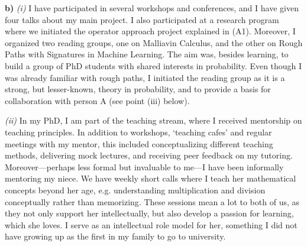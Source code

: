 \documentclass[./Research_statement.tex]{subfiles}
\begin{document}
\vspace{2pt}

\noindent \textbf{b)} \textit{(i)}
I have participated in several workshops and conferences, and I have given four talks about my main project. I also participated at a research program where we initiated the operator approach project explained in (A1). Moreover, I organized two reading groups, one on Malliavin Calculus, and the other on Rough Paths with Signatures in Machine Learning. The aim was, besides learning, to build a group of PhD students with shared interests in probability. Even though I was already familiar with rough paths, I initiated the reading group as it is a strong, but lesser-known, theory in probability, and to provide a basis for collaboration with person A (see point (iii) below).


\vspace{2pt}

\noindent \textit{(ii)}  In my PhD, I am part of the teaching stream, where I received mentorship on teaching principles. In addition to workshops, `teaching cafes' and regular meetings with my mentor, this included conceptualizing different teaching methods, delivering mock lectures, and receiving peer feedback on my tutoring. Moreover---perhaps less formal but invaluable to me---I have been informally mentoring my niece. We have weekly short calls where I teach her mathematical concepts beyond her age, e.g. understanding multiplication and division conceptually rather than memorizing. These sessions mean a lot to both of us, as they not only support her intellectually, but also develop a passion for learning, which she loves. I serve as an intellectual role model for her, something I did not have growing up as the first in my family to go to university.


\vspace{2pt}
\end{document}
